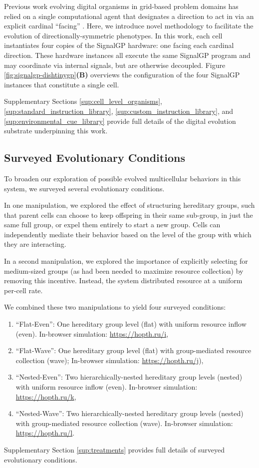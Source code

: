Previous work evolving digital organisms in grid-based problem domains has relied on a single computational agent that designates a direction to act in via an explicit cardinal ``facing'' \citep{goldsby2014evolutionary, goldsby2018serendipitous, grabowski2010early, biswas2014causes, lalejini2018evolving}.
Here, we introduce novel methodology to facilitate the evolution of directionally-symmetric phenotypes.
In this work, each cell instantiates four copies of the SignalGP hardware: one facing each cardinal direction.
These hardware instances all execute the same SignalGP program and may coordinate via internal signals, but are otherwise decoupled.
Figure \ref{fig:signalgp-dishtinygp}\textbf{(B)} overviews the configuration of the four SignalGP instances that constitute a single cell.

Supplementary Sections \ref{sup:cell_level_organisms}, \ref{sup:standard_instruction_library}, \ref{sup:custom_instruction_library}, and \ref{sup:environmental_cue_library} provide full details of the digital evolution substrate underpinning this work.

\subsection{Surveyed Evolutionary Conditions}

To broaden our exploration of possible evolved multicellular behaviors in this system, we surveyed several evolutionary conditions.

In one manipulation, we explored the effect of structuring hereditary groups, such that parent cells can choose to keep offspring in their same sub-group, in just the same full group, or expel them entirely to start a new group.
Cells can independently mediate their behavior based on the level of the group with which they are interacting.

In a second manipulation, we explored the importance of explicitly selecting for medium-sized groups (as had been needed to maximize resource collection) by removing this incentive.
Instead, the system distributed resource at a uniform per-cell rate.

We combined these two manipulations to yield four surveyed conditions:
\begin{enumerate}
\item ``Flat-Even'': One hereditary group level (flat) with uniform resource inflow (even). In-browser simulation: \url{https://hopth.ru/i},
\item ``Flat-Wave'': One  hereditary group level (flat) with group-mediated resource collection (wave); In-browser simulation: \url{https://hopth.ru/j}),
\item ``Nested-Even'': Two hierarchically-nested hereditary group levels (nested) with uniform resource inflow (even). In-browser simulation: \url{https://hopth.ru/k},
\item ``Nested-Wave'': Two hierarchically-nested hereditary group levels (nested) with group-mediated resource collection (wave). In-browser simulation: \url{https://hopth.ru/l}.
\end{enumerate}

Supplementary Section \ref{sup:treatments} provides full details of surveyed evolutionary conditions.
